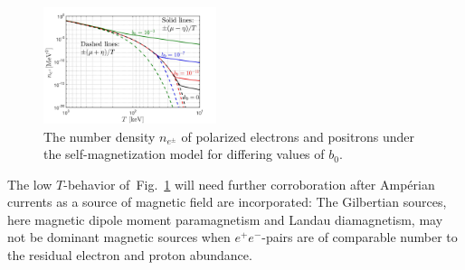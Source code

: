 \documentclass[aps,prd,floatfix,reprint]{revtex4-2}
\newcommand{\rf}[1]{Fig.~{\ref{#1}}}
\begin{document}
\begin{figure}%
 \centering
\includegraphics[width=0.45\textwidth]{plots/ElectronDenisty_SpinChemicalPotential004.jpg}
 \caption{The number density $n_{e^{\pm}}$ of polarized electrons and positrons under the self-magnetization model for differing values of $b_{0}$.}
 \label{fig:polarswap} 
\end{figure}

The low $T$-behavior of~\rf{fig:polarswap} will need further corroboration after Amp{\'e}rian currents as a source of magnetic field are incorporated: The Gilbertian sources, here magnetic dipole moment paramagnetism and Landau diamagnetism, may not be dominant magnetic sources when $e^{+}e^{-}$-pairs are of comparable number to the residual electron and proton abundance.
\end{document}
